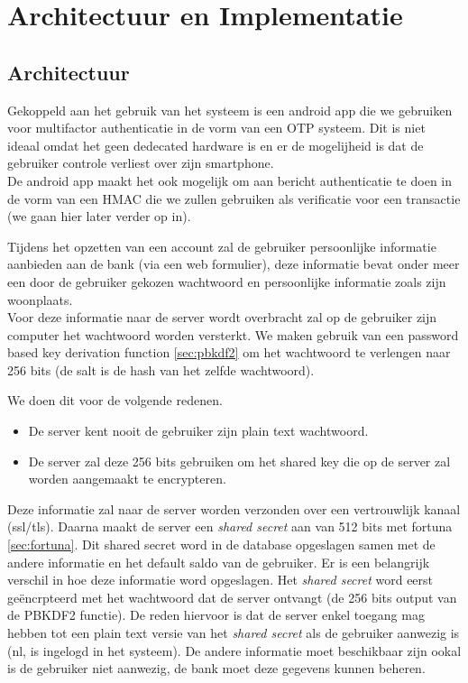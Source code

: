 \documentclass[11pt]{article}
\begin{document}
\section{Architectuur en Implementatie}
\subsection{Architectuur}
Gekoppeld aan het gebruik van het systeem is een android app die we gebruiken voor multifactor authenticatie in de vorm van een OTP systeem. Dit is niet ideaal omdat het geen dedecated hardware is en er de mogelijheid is dat de gebruiker controle verliest over zijn smartphone.\\

De android app maakt het ook mogelijk om aan bericht authenticatie te doen in de vorm van een HMAC die we zullen gebruiken als verificatie voor een transactie (we gaan hier later verder op in).

Tijdens het opzetten van een account zal de gebruiker persoonlijke informatie aanbieden aan de bank (via een web formulier), deze informatie bevat onder meer een door de gebruiker gekozen wachtwoord en persoonlijke informatie zoals zijn  woonplaats.\\

Voor deze informatie naar de server wordt overbracht zal op de gebruiker zijn computer het wachtwoord worden versterkt. We maken gebruik van een password based key derivation function \ref{sec:pbkdf2}\cite{death_of_clever} om het wachtwoord te verlengen naar 256 bits (de salt is de hash van het zelfde wachtwoord). 

We doen dit voor de volgende redenen.
\begin{itemize}
\item De server kent nooit de gebruiker zijn plain text wachtwoord. 
\item De server zal deze 256 bits gebruiken om het shared key die op de server zal worden aangemaakt te encrypteren.
\end{itemize}

Deze informatie zal naar de server worden verzonden over een vertrouwlijk kanaal (ssl/tls). 
Daarna maakt de server een \emph{shared secret} aan van 512 bits met fortuna \ref{sec:fortuna}. Dit shared secret word in de database opgeslagen samen met de andere informatie en het default saldo van de gebruiker. Er is een belangrijk verschil in hoe deze informatie word opgeslagen. Het \emph{shared secret} word eerst ge\"encrpteerd met het wachtwoord dat de server ontvangt (de 256 bits output van de PBKDF2 functie). De reden hiervoor is dat de server enkel toegang mag hebben tot een plain text versie van het \emph{shared secret} als de gebruiker aanwezig is (nl, is ingelogd in het systeem). De andere informatie moet beschikbaar zijn ookal is de gebruiker niet aanwezig, de bank moet deze gegevens kunnen beheren.
\end{document}
